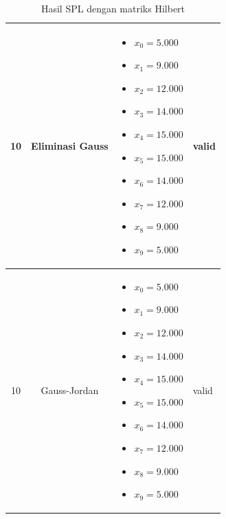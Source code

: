 \documentclass[12pt,a4paper]{report}
\begin{document}
\begin{table}[H]
    \centering
    \caption{Hasil SPL dengan matriks Hilbert}
    \begin{tabular}{|c|c|p{5cm}|l|}
        \hline
        10 & Eliminasi Gauss & 
        \begin{itemize}
            \item $x_0 = 5.000$
            \item $x_1 = 9.000$
            \item $x_2 = 12.000$
            \item $x_3 = 14.000$
            \item $x_4 = 15.000$
            \item $x_5 = 15.000$
            \item $x_6 = 14.000$
            \item $x_7 = 12.000$
            \item $x_8 = 9.000$
            \item $x_9 = 5.000$
        \end{itemize}
        & valid \\
        \hline
        10 & Gauss-Jordan & 
        \begin{itemize}
            \item $x_0 = 5.000$
            \item $x_1 = 9.000$
            \item $x_2 = 12.000$
            \item $x_3 = 14.000$
            \item $x_4 = 15.000$
            \item $x_5 = 15.000$
            \item $x_6 = 14.000$
            \item $x_7 = 12.000$
            \item $x_8 = 9.000$
            \item $x_9 = 5.000$
        \end{itemize}
        & valid \\
        \hline
        \end{tabular}
\end{table}
\end{document}
